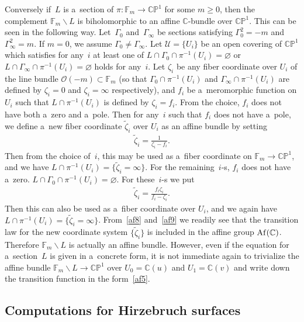 \documentclass[11pt]{article}
\numberwithin{equation}{section}
\begin{document}
Conversely if~$L$ is a~section of $\pi:\mathbb{F}_m\to\mathbb{CP}^1$ for some $m\ge 0$, then the complement
$\mathbb{F}_m\backslash L$ is biholomorphic to an af\/f\/ine $\mathbb{C}$-bundle over $\mathbb{CP}^1$.
This can be seen in the following way.
Let~$\Gamma_0$ and~$\Gamma_{\infty}$ be sections satisfying $\Gamma_0^2 = -m$ and $\Gamma_{\infty}^2 = m$.
If $m=0$, we assume $\Gamma_0\neq \Gamma_{\infty}$.
Let $\mathscr U=\{U_i\}$ be an open covering of $\mathbb{CP}^1$ which satisf\/ies for any~$i$ at least one of $L\cap
\Gamma_0\cap \pi^{-1} (U_i)=\varnothing$ or $L\cap \Gamma_{\infty}\cap \pi^{-1} (U_i)=\varnothing$ holds for any~$i$.
Let $\zeta_i$ be any f\/iber coordinate over $U_i$ of the line bundle $\mathscr O(-m)\subset\mathbb{F}_m$ (so that
$\Gamma_0\cap\pi^{-1} (U_i)$ and $\Gamma_{\infty}\cap\pi^{-1} (U_i)$ are def\/ined by $\zeta_i=0$ and $\zeta_i=\infty$
respectively), and $f_i$ be a~meromorphic function on $U_i$ such that $L\cap\pi^{-1} (U_i)$ is def\/ined by $\zeta_i =
f_i$.
From the choice, $f_i$ does not have both a~zero and a~pole.
Then for any~$i$ such that $f_i$ does not have a~pole, we def\/ine a~new f\/iber coordinate $\tilde{\zeta}_i$ over $U_i$
as an af\/f\/ine bundle by setting
\begin{gather}
\label{af8}
\tilde{\zeta}_i = \frac 1{\zeta_i-f_i}.
\end{gather}
Then from the choice of~$i$, this may be used as a~f\/iber coordinate on $\mathbb{F}_m\to\mathbb{CP}^1$, and we have
$L\cap \pi^{-1}(U_i) = \{\tilde{\zeta}_i = \infty\}$.
For the remaining~$i$-s, $f_i$ does not have a~zero.
$L\cap \Gamma_0 \cap \pi^{-1} (U_i)=\varnothing$.
For these~$i$-s we put
\begin{gather}
\label{af9}
\tilde{\zeta}_i = \frac{f_i\zeta_i}{f_i-\zeta_i}.
\end{gather}
Then this can also be used as a~f\/iber coordinate over $U_i$, and we again have $L\cap \pi^{-1}(U_i) =
\{\tilde{\zeta}_i = \infty\}$.
From~\eqref{af8} and~\eqref{af9} we readily see that the transition law for the new coordinate system
$\{\tilde{\zeta}_i\}$ is included in the af\/f\/ine group ${\rm Af}(\mathbb{C})$.
Therefore $\mathbb{F}_m\backslash L$ is actually an af\/f\/ine bundle.
However, even if the equation for a~section~$L$ is given in a~concrete form, it is not immediate again to trivialize the
af\/f\/ine bundle $\mathbb{F}_m\backslash L\to\mathbb{CP}^1$ over $U_0=\mathbb{C}(u)$ and $U_1=\mathbb{C}(v)$ and write
down the transition function in the form~\eqref{af5}.

\subsection{Computations for Hirzebruch surfaces}
\end{document}
